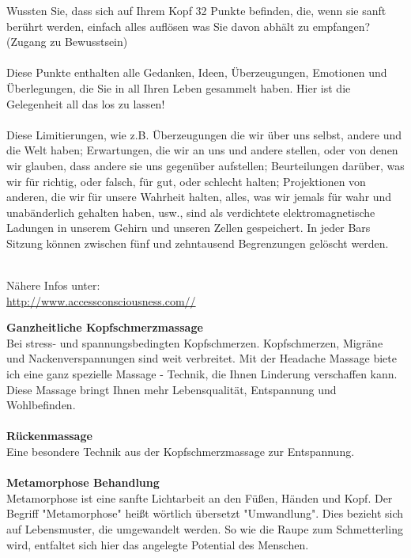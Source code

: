 \documentclass[10pt,foldmark,notumble]{leaflet}
\begin{document}
Wussten Sie, dass sich auf Ihrem Kopf 32 Punkte befinden, die, wenn sie sanft berührt werden, einfach alles auflösen was Sie davon abhält zu empfangen? (Zugang zu Bewusstsein)\\
\\
Diese Punkte enthalten alle Gedanken, Ideen, Überzeugungen, Emotionen und Überlegungen, die Sie in all Ihren Leben gesammelt haben. Hier ist die Gelegenheit all das los zu lassen!\\
\\
Diese Limitierungen, wie z.B. Überzeugungen die wir über uns selbst, andere und die Welt haben; Erwartungen, die wir an uns und andere stellen, oder von denen wir glauben, dass andere sie uns gegenüber aufstellen; Beurteilungen darüber, was wir für richtig, oder falsch, für gut, oder schlecht halten; Projektionen von anderen, die wir für unsere Wahrheit halten, alles, was wir jemals für wahr und unabänderlich gehalten haben, usw., sind als verdichtete elektromagnetische Ladungen in unserem Gehirn und unseren Zellen gespeichert. In jeder Bars Sitzung können zwischen fünf und zehntausend Begrenzungen gelöscht werden.\\
\\
\vfill
\begin{center}
Nähere Infos unter:\\
{\url{http://www.accessconsciousness.com//}} \\
\end{center}
\vfill
\newpage
{\large \bf Ganzheitliche Kopfschmerzmassage}\\
Bei stress- und spannungsbedingten Kopfschmerzen. 
Kopfschmerzen, Migräne und Nackenverspannungen sind weit verbreitet. Mit der Headache Massage biete ich eine ganz spezielle Massage - Technik, die Ihnen Linderung verschaffen kann. Diese Massage bringt Ihnen mehr Lebensqualität, Entspannung und Wohlbefinden. \\
\\
{\large \bf Rückenmassage}\\
Eine besondere Technik aus der Kopfschmerzmassage zur Entspannung. \\
\\
{\large \bf Metamorphose Behandlung}\\
Metamorphose ist eine sanfte Lichtarbeit an den Füßen, Händen und Kopf. Der Begriff "Metamorphose" heißt wörtlich übersetzt "Umwandlung". Dies bezieht sich auf Lebensmuster, die umgewandelt werden. So wie die Raupe zum Schmetterling wird, entfaltet sich hier das angelegte Potential des Menschen. \\
\end{document}
